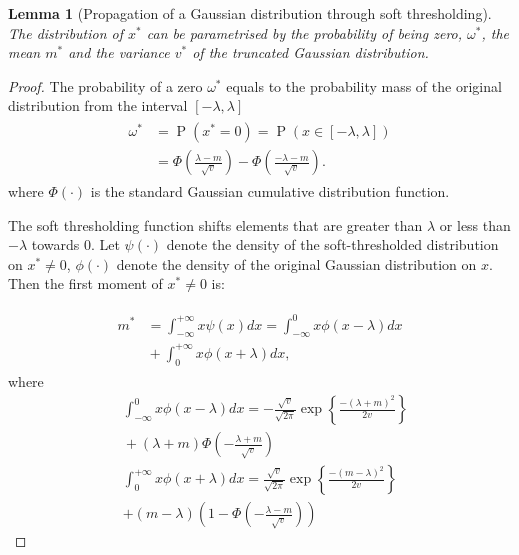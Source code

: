 \documentclass[letterpaper]{article}
\newtheorem{lemma}{Lemma}
\begin{document}
\begin{lemma}[Propagation of a Gaussian distribution through soft thresholding]
\label{thm:soft_thresholding}
The distribution of $x^*$ can be parametrised by the probability of being zero, $\omega^*$, the mean $m^*$ and the variance $v^*$ of the truncated Gaussian distribution.
\end{lemma}
\begin{proof}

The probability of a zero $\omega^*$ equals to the probability mass of the original distribution from the interval $[-\lambda, \lambda]$
\begin{align}
\begin{split}
\omega^* &=\operatorname{P}(x^*=0) = \operatorname{P}(x \in [-\lambda, \lambda]) \\
&= \Phi\left(\frac{\lambda-m}{\sqrt{v}}\right) - \Phi\left(\frac{-\lambda-m}{\sqrt{v}}\right).
\end{split}
\end{align}
where $\Phi(\cdot)$ is the standard Gaussian cumulative distribution function.

The soft thresholding function shifts elements that are greater than $\lambda$  or less than $-\lambda$ towards $0$. Let $\psi(\cdot)$ denote the density of the soft-thresholded distribution on $x^* \neq 0$, $\phi(\cdot)$ denote the density of the original Gaussian distribution on $x$. Then the first moment of $x^* \neq 0$ is:

\begin{align}
\label{eq:thr_first_moment}
\begin{split}
m^* &= \int_{-\infty}^{+\infty}x\psi(x)dx= \int_{-\infty}^{0}x\phi(x-\lambda)dx \\
&{} + \int_{0}^{+\infty}x\phi(x+\lambda)dx,
\end{split}
\end{align}
where
\begin{align}
&\int_{-\infty}^{0}x\phi(x-\lambda)dx = -\frac{\sqrt{v}}{\sqrt{2\pi}} \exp\left\{\frac{-(\lambda+m)^2}{2v}\right\} \nonumber\\
&{} + (\lambda+m)\Phi\left(-\frac{\lambda+m}{\sqrt{v}}\right)\\
&\int_{0}^{+\infty}x\phi(x+\lambda)dx = \frac{\sqrt{v}}{\sqrt{2\pi}} \exp\left\{\frac{-(m - \lambda)^2}{2v}\right\}\nonumber\\
& + (m - \lambda)\left(1 - \Phi\left(-\frac{\lambda-m}{\sqrt{v}}\right)\right)
\end{align}


\end{proof}
\end{document}
